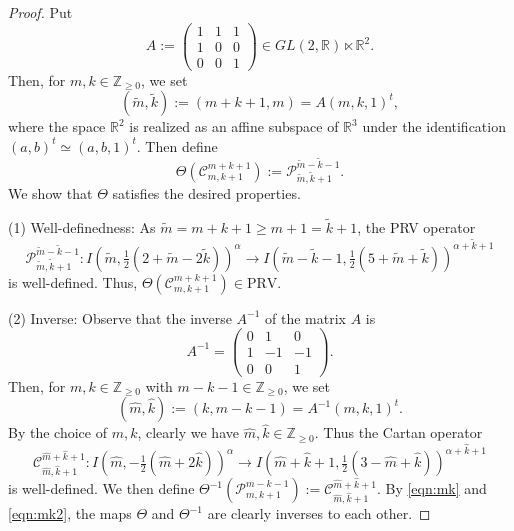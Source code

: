 \documentclass[reqno,11pt]{amsart}
\theoremstyle{remark}
\numberwithin{equation}{section}
\newcommand{\ga}{\alpha}
\newcommand{\R}{\mathbb{R}}
\newcommand{\Z}{\mathbb{Z}}
\newcommand{\Cal}{\mathcal}
\newcommand{\To}{\longrightarrow}
\newcommand{\wk}{\widetilde{k}}
\newcommand{\wm}{\widetilde{m}}
\newcommand{\PRV}{\mathrm{PRV}}
\begin{document}
\begin{proof}
Put 
\begin{equation*}
A:=
\begin{pmatrix}
1 & 1 & 1 \\
1 & 0 & 0\\
0 & 0& 1
\end{pmatrix}
\in GL(2,\R) \ltimes \R^2.
\end{equation*}
Then, for $m,k \in \Z_{\geq 0}$, we set
\begin{equation}\label{eqn:mk}
(\wm, \wk):=
(m+k+1, m)=
A
(m,k, 1)^t,
\end{equation}
where the space $\R^2$ is realized as 
an affine subspace of $\R^3$ under the identification
$(a, b)^t \simeq (a, b, 1)^t$.
Then define 
\begin{equation*}
\Theta(\Cal{C}^{m+k+1}_{m,k+1}):=
\Cal{P}^{\wm-\wk-1}_{\wm,\wk+1}.
\end{equation*}
We show that $\Theta$ satisfies the desired properties.
\vskip 0.1in

(1) Well-definedness: As  $\wm=m+k+1\geq m+1 =\wk+1$,
the PRV operator 
\begin{equation}\label{eqn:P}
\Cal{P}^{\wm-\wk-1}_{\wm,\wk+1}\colon 
I(\wm, \tfrac{1}{2}(2+\wm-2\wk))^{\ga}
\To
I(\wm-\wk-1, \tfrac{1}{2}(5+\wm+\wk))^{\ga+\wk+1}
\end{equation}
is well-defined. Thus, $\Theta(\Cal{C}^{m+k+1}_{m,k+1}) \in \PRV$.
\vskip 0.1in

(2) Inverse: 
Observe that 
the inverse $A^{-1}$ of the matrix $A$  is 
\begin{equation*}
A^{-1}=
\begin{pmatrix}
0 & 1 & 0 \\
1 & -1 & -1\\
0 & 0& 1
\end{pmatrix}.
\end{equation*}
Then, for $m,k \in \Z_{\geq 0}$ with $m-k-1 \in \Z_{\geq 0}$,
we set
\begin{equation}\label{eqn:mk2}
(\widehat{m}, \widehat{k}):=(k, m-k-1)
=A^{-1}(m,k,1)^t.
\end{equation}
By the choice of $m,k$, clearly we have $\widehat{m}, \widehat{k} \in \Z_{\geq 0}$.
Thus the Cartan operator 
\begin{equation*}
\Cal{C}^{\widehat{m}+\widehat{k}+1}_{\widehat{m},\widehat{k}+1}\colon 
I(\widehat{m}, -\tfrac{1}{2}(\widehat{m}+2\widehat{k}))^{\ga}
\To
I(\widehat{m}+\widehat{k}+1, 
\tfrac{1}{2}(3-\widehat{m}+\widehat{k}))^{\ga+\widehat{k}+1}
\end{equation*}
is well-defined. We then define 
$\Theta^{-1}(\Cal{P}^{m-k-1}_{m,k+1}):=
\Cal{C}^{\widehat{m}+\widehat{k}+1}_{\widehat{m},\widehat{k}+1}$.
By \eqref{eqn:mk} and \eqref{eqn:mk2},
the maps  $\Theta$ and $\Theta^{-1}$ are clearly inverses to each other.
\vskip 0.1in


\end{proof}
\end{document}
